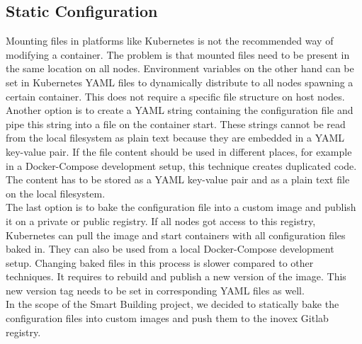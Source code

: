 \subsection{Static Configuration}
Mounting files in platforms like Kubernetes is not the recommended way of modifying a container. The problem is that mounted files need to be present in the same location on all nodes. Environment variables on the other hand can be set in Kubernetes YAML files to dynamically distribute to all nodes spawning a certain container. This does not require a specific file structure on host nodes.\\
Another option is to create a YAML string containing the configuration file and pipe this string into a file on the container start. These strings cannot be read from the local filesystem as plain text because they are embedded in a YAML key-value pair. If the file content should be used in different places, for example in a Docker-Compose development setup, this technique creates duplicated code. The content has to be stored as a YAML key-value pair and as a plain text file on the local filesystem.\\
The last option is to bake the configuration file into a custom image and publish it on a private or public registry. If all nodes got access to this registry, Kubernetes can pull the image and start containers with all configuration files baked in. They can also be used from a local Docker-Compose development setup. Changing baked files in this process is slower compared to other techniques. It requires to rebuild and publish a new version of the image. This new version tag needs to be set in corresponding YAML files as well.\\
In the scope of the Smart Building project, we decided to statically bake the configuration files into custom images and push them to the inovex Gitlab registry.

